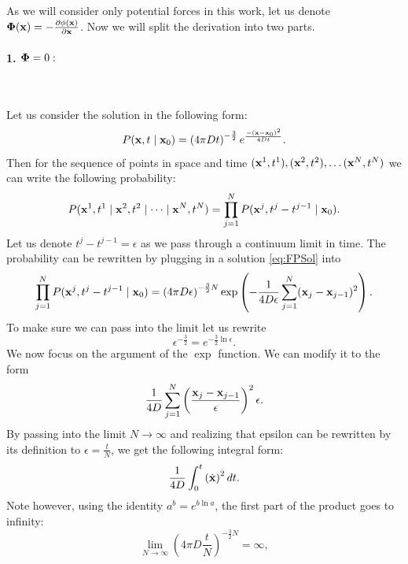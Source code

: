 As we will consider only potential forces in this work, let us denote $\mathbf{\Phi}(\mathbf{x}) = - \frac{\partial \phi(\mathbf{x})}{\partial \mathbf{x}}$.
Now we will split the derivation into two parts. 

\paragraph{1. $\mathbf{\Phi} = 0:$} \

Let us consider the solution in the following form:
\begin{equation}
\label{eq:FPSol}
    P(\mathbf{x}, t \mid \mathbf{x}_0) = \left( 4 \pi D t \right)^{-\frac{3}{2}} e^{\frac{- (\mathbf{x} - \mathbf{x}_0)^2}{4 D t}}.
\end{equation}
Then for the sequence of points in space and time $(\mathbf{x}^1, t^1), (\mathbf{x}^2, t^2), \dots (\mathbf{x}^N, t^N)$ we can write the following probability:
\begin{equation}
    P(\mathbf{x}^1, t^1 \mid \mathbf{x}^2, t^2 \mid \dots \mid \mathbf{x}^N, t^N) = \prod_{j=1}^{N} P (\mathbf{x}^j, t^j - t^{j-1} \mid \mathbf{x}_0).
\end{equation}
Let us denote $t^j - t^{j-1} = \epsilon$ as we pass through a continuum limit in time. The probability can be rewritten by plugging in a solution \eqref{eq:FPSol} into
\begin{equation}
    \prod_{j=1}^{N} P (\mathbf{x}^j, t^j - t^{j-1} \mid \mathbf{x}_0) = \left( 4 \pi D \epsilon \right)^{-\frac{3}{2} N} \exp \left( -\frac{1}{4 D \epsilon} \sum_{j=1}^{N} (\mathbf{x}_j - \mathbf{x}_{j-1})^2 \right).
\end{equation}
To make sure we can pass into the limit let us rewrite
\begin{equation}
    \epsilon^{-\frac{3}{2}} = e^{-\frac{3}{2} \ln\epsilon}.
\end{equation}
We now focus on the argument of the $\exp$ function. We can modify it to the form 
\begin{equation}
    \frac{1}{4D} \sum_{j=1}^{N} \left(\frac{\mathbf{x}_j-\mathbf{x}_{j-1}}{\epsilon} \right)^2 \epsilon.
\end{equation}
By passing into the limit $N \to \infty$ and realizing that epsilon can be rewritten by its definition to $\epsilon = \frac{t}{N}$, we get the following integral form:
\begin{equation}
    \frac{1}{4D} \int_{0}^{t} \left(\dot{\mathbf{x}} \right)^2 dt.
\end{equation}
Note however, using the identity $a^{b} = e^{b \ln a}$, the first part of the product goes to infinity:
\begin{equation}
    \lim_{N \to \infty} \left( 4 \pi D \frac{t}{N} \right)^{-\frac{3}{2}N} = \infty,
\end{equation}
